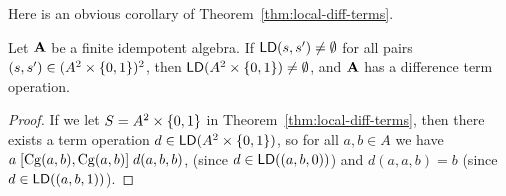 Here is an obvious corollary of Theorem~\ref{thm:local-diff-terms}. 
\begin{corollary}
\label{cor:loc-diff-term}
  Let $\mathbf{A}$ be a finite idempotent algebra.
If $\mathsf{LD} (s, s') \neq \emptyset$ for all pairs $(s, s') \in (A^2 \times \{0,1\})^2$,
then $\mathsf{LD} (A^2 \times \{0,1\}) \neq \emptyset$,
and $\mathbf{A}$ has a difference term operation.
\end{corollary}
\begin{proof}
  If we let $S = A^2 \times \{0,1\}$ in Theorem~\ref{thm:local-diff-terms}, then there exists a term operation $d \in \mathsf{LD}(A^2 \times \{0,1\})$, so 
  for all $a, b \in A$ we have $a \mathrel{[\operatorname{Cg}(a,b), \operatorname{Cg}(a,b)]} d(a,b,b)$,
  (since $d \in \mathsf{LD}((a,b,0))$) and $d(a,a,b) = b$ (since $d\in \mathsf{LD}((a,b,1))$).
\end{proof}
% 
%   


